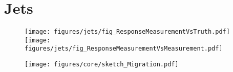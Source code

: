 

\section{Jets} \label{sec:App:Jets}
\begin{figure}[!ht]
  \centering
  \texttt{[image: figures/jets/fig\_ResponseMeasurementVsTruth.pdf]} \\
  \texttt{[image: figures/jets/fig\_ResponseMeasurementVsMeasurement.pdf]}
  \caption{}
  \label{fig:App:Jets:ResponseMeasurementProcedure}
\end{figure}

\begin{figure}[!ht]
 \centering
 \texttt{[image: figures/core/sketch\_Migration.pdf]}
 \caption{
 }
 \label{fig:App:Jets:Migration}
\end{figure}



